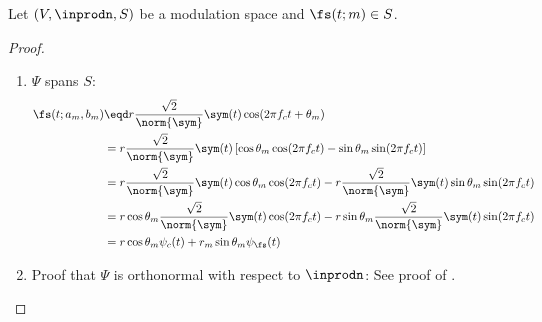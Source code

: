 \begin{proposition}
\label{lem:psk_basis}
Let $(V, \inprodn, S)$ be a modulation space and $\fs(t;m)\in S$.
\end{proposition}
\begin{proof}
\begin{enumerate}
  \item  $\Psi$ spans $S$:
    \begin{align*}
       \fs(t;a_m,b_m) 
         &\eqd r\frac{\sqrt{2}}{\norm{\sym}} \sym(t) \cos(2\pi f_c t + \theta_m)
       \\&=    r\frac{\sqrt{2}}{\norm{\sym}} \sym(t) 
               \left[ \cos\theta_m\cos(2\pi f_ct)-\sin\theta_m\sin(2\pi f_ct)\right]  
       \\&=    r\frac{\sqrt{2}}{\norm{\sym}} \sym(t)\cos\theta_m\cos(2\pi f_ct) - 
               r\frac{\sqrt{2}}{\norm{\sym}} \sym(t)\sin\theta_m\sin(2\pi f_ct)
       \\&=    r\cos\theta_m\frac{\sqrt{2}}{\norm{\sym}} \sym(t)\cos(2\pi f_ct) - 
               r\sin\theta_m\frac{\sqrt{2}}{\norm{\sym}} \sym(t)\sin(2\pi f_ct)
       \\&=    r\cos\theta_m \psi_c(t) + r_m\sin\theta_m \psi_\fs(t)
    \end{align*}

\item Proof that $\Psi$ is orthonormal with respect to $\inprodn$:
  See proof of .
\end{enumerate}
\end{proof}

